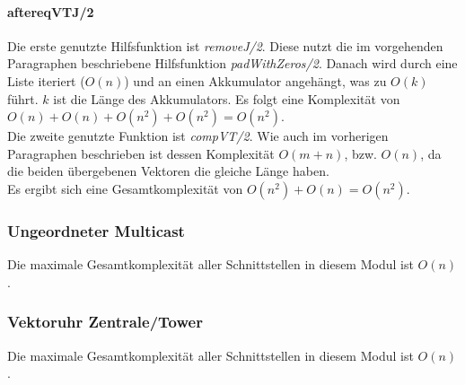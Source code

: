 \paragraph{aftereqVTJ/2} \label{aftereqVTJ_complexity}

Die erste genutzte Hilfsfunktion ist \textit{removeJ/2}. Diese nutzt die im vorgehenden Paragraphen beschriebene Hilfsfunktion \textit{padWithZeros/2}. Danach wird durch eine Liste iteriert ($O(n)$) und an einen Akkumulator angehängt, was zu $O(k)$ führt. $k$ ist die Länge des Akkumulators. Es folgt eine Komplexität von $O(n)+O(n)+O(n^2)+O(n^2)=O(n^2)$.\\
Die zweite genutzte Funktion ist \textit{compVT/2}. Wie auch im vorherigen Paragraphen beschrieben ist dessen Komplexität $O(m+n)$, bzw. $O(n)$, da die beiden übergebenen Vektoren die gleiche Länge haben.\\
Es ergibt sich eine Gesamtkomplexität von $O(n^2)+O(n)=O(n^2).$

\subsubsection{Ungeordneter Multicast}

Die maximale Gesamtkomplexität aller Schnittstellen in diesem Modul ist $O(n)$.

\subsubsection{Vektoruhr Zentrale/Tower}

Die maximale Gesamtkomplexität aller Schnittstellen in diesem Modul ist $O(n)$.